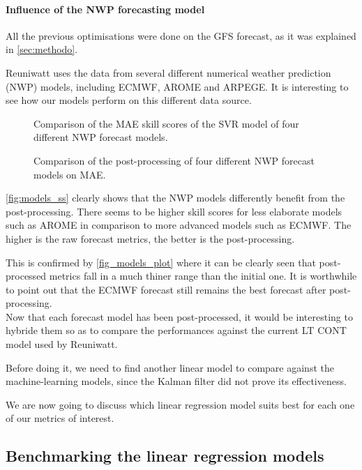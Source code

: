 \paragraph{Influence of the NWP forecasting model}
All the previous optimisations were done on the GFS forecast, as it was explained in \autoref{sec:methodo}.

Reuniwatt uses the data from several different numerical weather prediction (NWP) models, including ECMWF, AROME and ARPEGE.
It is interesting to see how our models perform on this different data source.
\begin{figure}[htb!]
    \centering
    
    \caption{Comparison of the MAE skill scores of the SVR model of four different NWP forecast models.}
    \label{fig:models_ss}   
\end{figure}

\begin{figure}[htb!]
    \centering
    
\caption{Comparison of the post-processing of four different NWP forecast models on MAE.}
\label{fig:models_plot}
\end{figure}

\autoref{fig:models_ss} clearly shows that the NWP models differently benefit from the post-processing.
There seems to be higher skill scores for less elaborate models such as AROME in comparison to more advanced models such as ECMWF. The higher is the raw forecast metrics, the better is the post-processing.

This is confirmed by \autoref{fig_models_plot} where it can be clearly seen that post-processed metrics fall in a much thiner range than the initial one. It is worthwhile to point out that the ECMWF forecast still remains the best forecast after post-processing.\\

Now that each forecast model has been post-processed, it would be interesting to hybride them so as to compare the performances against the current LT CONT model used by Reuniwatt.

Before doing it, we need to find another linear model to compare against the machine-learning models, since the Kalman filter did not prove its effectiveness.

We are now going to discuss which linear regression model suits best for each one of our metrics of interest.
\subsection{Benchmarking the linear regression models}

